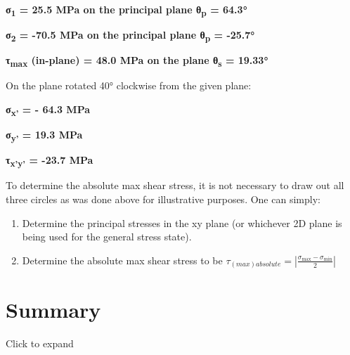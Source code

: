 \documentclass[
  letterpaper,
  DIV=11,
  numbers=noendperiod]{scrreprt}
\theoremstyle{definition}
\theoremstyle{remark}
\begin{document}
\begin{tcolorbox}
\begin{tcolorbox}
\textbf{σ\textsubscript{1} = 25.5 MPa on the principal plane
θ\textsubscript{p} = 64.3°}

\textbf{σ\textsubscript{2} = -70.5 MPa on the principal plane
θ\textsubscript{p} = -25.7°}

\textbf{τ\textsubscript{max} (in-plane) = 48.0 MPa on the plane
θ\textsubscript{s} = 19.33°}

On the plane rotated 40° clockwise from the given plane:

\textbf{σ\textsubscript{x'} = - 64.3 MPa}

\textbf{σ\textsubscript{y'} = 19.3 MPa}

\textbf{τ\textsubscript{x'y'} = -23.7 MPa}

\end{tcolorbox}

\end{tcolorbox}

\begin{tcolorbox}[enhanced jigsaw, leftrule=.75mm, colbacktitle=quarto-callout-warning-color!10!white, breakable, opacityback=0, colback=white, titlerule=0mm, toprule=.15mm, colframe=quarto-callout-warning-color-frame, coltitle=black, title={Step-by-step: Determine Absolute Max Shear Stress}, toptitle=1mm, bottomrule=.15mm, rightrule=.15mm, left=2mm, arc=.35mm, opacitybacktitle=0.6, bottomtitle=1mm]

To determine the absolute max shear stress, it is not necessary to draw
out all three circles as was done above for illustrative purposes. One
can simply:

\begin{enumerate}
\def\labelenumi{\arabic{enumi}.}
\item
  Determine the principal stresses in the xy plane (or whichever 2D
  plane is being used for the general stress state).
\item
  Determine the absolute max shear stress to be
  \(\tau_{(max)absolute}=\left|\frac{\sigma_{\max }-\sigma_{\min }}{2}\right|\)
\end{enumerate}

\end{tcolorbox}

\section*{Summary}\label{summary-11}


Click to expand
\end{document}
